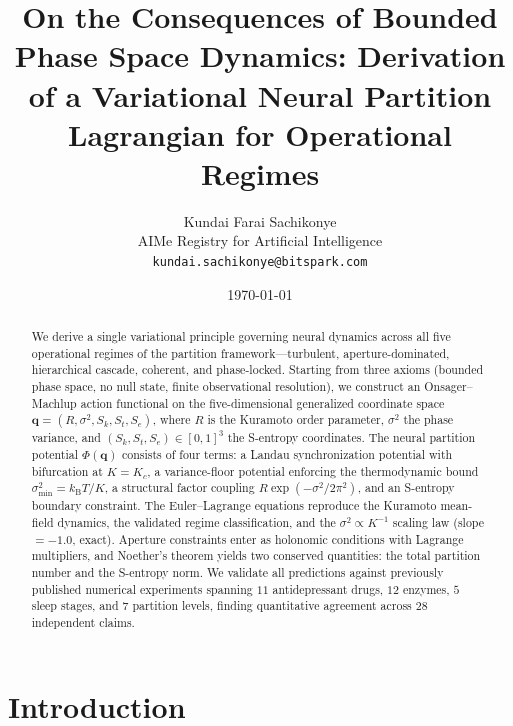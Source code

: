 \documentclass[twocolumn,aps,prl,superscriptaddress,floatfix]{revtex4-2}
\newcommand{\Pot}{\Phi}
\newcommand{\kB}{k_{\mathrm{B}}}
\newcommand{\Sk}{S_k}
\newcommand{\St}{S_t}
\newcommand{\Se}{S_e}
\newcommand{\qvec}{\mathbf{q}}
\newcommand{\Kc}{K_c}
\newcommand{\sigmin}{\sigma^2_{\mathrm{min}}}
\begin{document}
\title{On the Consequences of Bounded Phase Space Dynamics: Derivation of a Variational Neural Partition Lagrangian for Operational Regimes}

\author{
Kundai Farai Sachikonye\\
AIMe Registry for Artificial Intelligence\\
\texttt{kundai.sachikonye@bitspark.com}
}


\date{\today}

\begin{abstract}
We derive a single variational principle governing neural dynamics across all five operational regimes of the partition framework---turbulent, aperture-dominated, hierarchical cascade, coherent, and phase-locked.
Starting from three axioms (bounded phase space, no null state, finite observational resolution), we construct an Onsager--Machlup action functional on the five-dimensional generalized coordinate space $\qvec = (R, \sigma^2, \Sk, \St, \Se)$, where $R$ is the Kuramoto order parameter, $\sigma^2$ the phase variance, and $(\Sk, \St, \Se) \in [0,1]^3$ the S-entropy coordinates.
The neural partition potential $\Pot(\qvec)$ consists of four terms: a Landau synchronization potential with bifurcation at $K = \Kc$, a variance-floor potential enforcing the thermodynamic bound $\sigmin = \kB T / K$, a structural factor coupling $R \exp(-\sigma^2 / 2\pi^2)$, and an S-entropy boundary constraint.
The Euler--Lagrange equations reproduce the Kuramoto mean-field dynamics, the validated regime classification, and the $\sigma^2 \propto K^{-1}$ scaling law (slope $= -1.0$, exact).
Aperture constraints enter as holonomic conditions with Lagrange multipliers, and Noether's theorem yields two conserved quantities: the total partition number and the S-entropy norm.
We validate all predictions against previously published numerical experiments spanning $11$ antidepressant drugs, $12$ enzymes, $5$ sleep stages, and $7$ partition levels, finding quantitative agreement across $28$ independent claims.
\end{abstract}

\maketitle

\section{Introduction}
\label{sec:introduction}
\end{document}
